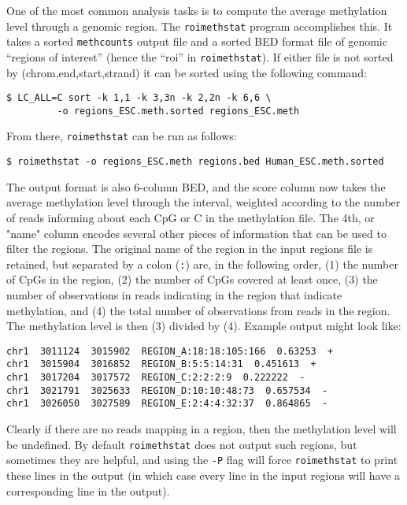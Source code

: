 \documentclass[10pt]{article}
\newcommand{\prog}[1]{\texttt{#1}}
\newcommand{\lit}[1]{\texttt{#1}}
\newcommand{\op}[1]{\texttt{#1}}
\begin{document}
{{One of the most common analysis tasks is to compute the average
methylation level through a genomic region. The \prog{roimethstat}
program accomplishes this. It takes a sorted \prog{methcounts} output
file and a sorted BED format file of genomic ``regions of interest''
(hence the ``roi'' in \prog{roimethstat}).  If either file is not
sorted by (chrom,end,start,strand) it can be sorted using the
following command:
\begin{verbatim}
$ LC_ALL=C sort -k 1,1 -k 3,3n -k 2,2n -k 6,6 \
         -o regions_ESC.meth.sorted regions_ESC.meth
\end{verbatim}
From there, \prog{roimethstat} can be run as follows:
\begin{verbatim}
$ roimethstat -o regions_ESC.meth regions.bed Human_ESC.meth.sorted
\end{verbatim}
The output format is also 6-column BED, and the score column now takes
the average methylation level through the interval, weighted according
to the number of reads informing about each CpG or C in the
methylation file. The 4th, or "name" column encodes several other
pieces of information that can be used to filter the regions. The
original name of the region in the input regions file is retained, but
separated by a colon (\lit{:}) are, in the following order, (1) the
number of CpGs in the region, (2) the number of CpGs covered at least
once, (3) the number of observations in reads indicating in the region
that indicate methylation, and (4) the total number of observations
from reads in the region. The methylation level is then (3) divided by
(4). Example output might look like:
\begin{verbatim}
chr1  3011124  3015902  REGION_A:18:18:105:166  0.63253  +
chr1  3015904  3016852  REGION_B:5:5:14:31  0.451613  +
chr1  3017204  3017572  REGION_C:2:2:2:9  0.222222  -
chr1  3021791  3025633  REGION_D:10:10:48:73  0.657534  -
chr1  3026050  3027589  REGION_E:2:4:4:32:37  0.864865  -
\end{verbatim}
Clearly if there are no reads mapping in a region, then the
methylation level will be undefined. By default \prog{roimethstat}
does not output such regions, but sometimes they are helpful, and
using the \op{-P} flag will force \prog{roimethstat} to print these
lines in the output (in which case every line in the input regions
will have a corresponding line in the output).


}}
\end{document}
